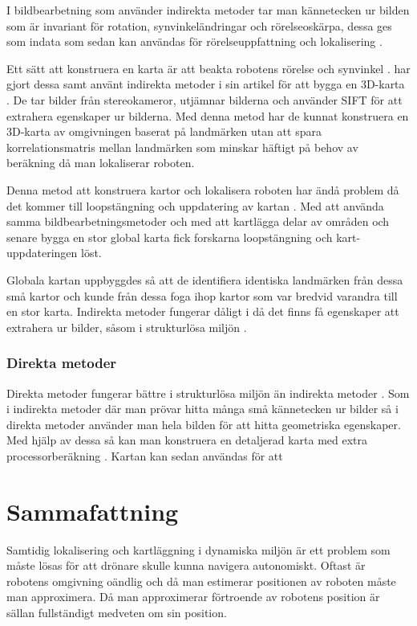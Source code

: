 I bildbearbetning som använder indirekta metoder tar man kännetecken ur bilden som är invariant för rotation, synvinkeländringar och rörelseoskärpa, dessa ges som indata som sedan kan användas för rörelseuppfattning och lokalisering \citep{geospatial}. 

Ett sätt att konstruera en karta är att beakta robotens rörelse och synvinkel \citep{globalsubmaps}. \cite{mapbuildingsift} har gjort dessa samt använt indirekta metoder i sin artikel  för att bygga en 3D-karta \citep{mapbuildingsift}. De tar bilder från stereokameror, utjämnar bilderna och använder SIFT för att extrahera egenskaper ur bilderna. Med denna metod har de kunnat konstruera en 3D-karta av omgivningen baserat på landmärken utan att spara korrelationsmatris mellan landmärken som minskar häftigt på behov av beräkning då man lokaliserar roboten. 

Denna metod att konstruera kartor och lokalisera roboten har ändå problem då det kommer till loopstängning och uppdatering av kartan \citep{globalsubmaps}. Med att använda samma bildbearbetningsmetoder och med att kartlägga delar av områden och senare bygga en stor global karta fick forskarna loopstängning och kart-uppdateringen löst. 

Globala kartan uppbyggdes så att de identifiera identiska landmärken från dessa små kartor och kunde från dessa foga ihop kartor som var bredvid varandra till en stor karta. Indirekta metoder fungerar dåligt i då det finns få egenskaper att extrahera ur bilder, såsom i strukturlösa miljön \citep{geospatial}.

\subsection{Direkta metoder}

Direkta metoder fungerar bättre i strukturlösa miljön än indirekta metoder \citep{Engel2014LSDSLAMLD}. Som i indirekta metoder där man prövar hitta många små kännetecken ur bilder så i direkta metoder använder man hela bilden för att hitta geometriska egenskaper. Med hjälp av dessa så kan man konstruera en detaljerad karta med extra processorberäkning \citep{geospatial}. Kartan kan sedan användas för att 

\chapter{Sammafattning}

Samtidig lokalisering och kartläggning i dynamiska miljön är ett problem som måste lösas för att drönare skulle kunna navigera autonomiskt. Oftast är robotens omgivning oändlig och då man estimerar positionen av roboten måste man approximera. Då man approximerar förtroende av robotens position är sällan fullständigt medveten om sin position. 

